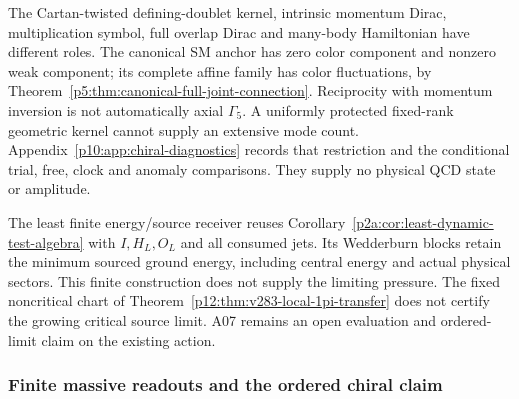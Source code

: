 \documentclass[12pt,a4paper]{article}
\begin{document}
The Cartan-twisted defining-doublet kernel, intrinsic momentum Dirac,
multiplication symbol, full overlap Dirac and many-body Hamiltonian
have different roles. The canonical SM anchor has zero color component
and nonzero weak component; its complete affine family has color
fluctuations, by Theorem~\ref{p5:thm:canonical-full-joint-connection}.
Reciprocity with momentum inversion is not automatically axial
$\Gamma_5$. A uniformly protected fixed-rank geometric kernel cannot
supply an extensive mode count. Appendix~\ref{p10:app:chiral-diagnostics}
records that restriction and the conditional trial, free, clock and
anomaly comparisons. They supply no physical QCD state or amplitude.

The least finite energy/source receiver reuses
Corollary~\ref{p2a:cor:least-dynamic-test-algebra} with
$I,H_L,O_L$ and all consumed jets. Its Wedderburn blocks retain the
minimum sourced ground energy, including central energy and actual
physical sectors. This finite construction does not supply the limiting
pressure. The fixed noncritical chart of
Theorem~\ref{p12:thm:v283-local-1pi-transfer} does not certify the
growing critical source limit. A07 remains an open evaluation and
ordered-limit claim on the existing action.




\subsubsection{Finite massive readouts and the ordered chiral claim}
\label{p10:sec:v2186-chiral-claim-hierarchy}
\end{document}
